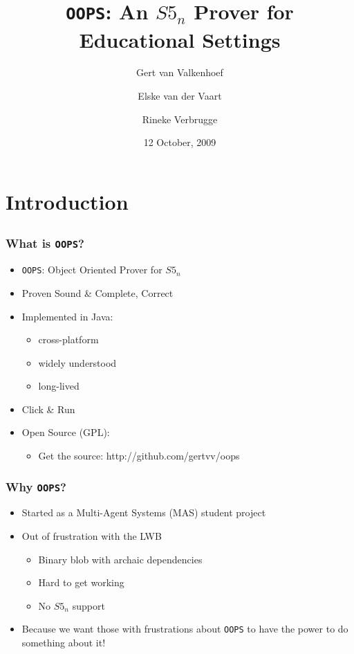 \documentclass{beamer}
\title{{\tt OOPS}: An $S5_n$ Prover for Educational Settings}
\author{Gert van Valkenhoef \and Elske van der Vaart \and Rineke Verbrugge}
\date{12 October, 2009}
\begin{document}
\begin{frame}
\maketitle
\end{frame}

\section{Introduction}
\subsection{}

\begin{frame}
\frametitle{What is {\tt OOPS}?}
\begin{itemize}
\item {\tt OOPS}: Object Oriented Prover for $S5_n$
\item Proven Sound \& Complete, Correct
\item Implemented in Java:
	\begin{itemize}
	\item cross-platform
	\item widely understood
	\item long-lived
	\end{itemize}
\item Click \& Run
\item Open Source (GPL):
	\begin{itemize}
	\item Get the source: http://github.com/gertvv/oops
	\end{itemize}
\end{itemize}
\end{frame}

\begin{frame}
\frametitle{Why {\tt OOPS}?}
\begin{itemize}
\item Started as a Multi-Agent Systems (MAS) student project
\item Out of frustration with the LWB
	\begin{itemize}
	\item Binary blob with archaic dependencies
	\item Hard to get working
	\item No $S5_n$ support
	\end{itemize}
\item Because we want those with frustrations about {\tt OOPS} to have the power to do something about it!
\end{itemize}
\end{frame}
\end{document}
